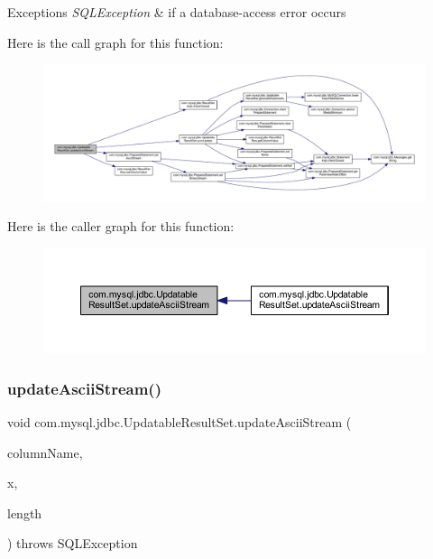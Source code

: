 \begin{DoxyExceptions}{Exceptions}
{\em S\+Q\+L\+Exception} & if a database-\/access error occurs \\
\hline
\end{DoxyExceptions}
Here is the call graph for this function\+:
\nopagebreak
\begin{figure}[H]
\begin{center}
\leavevmode
\includegraphics[width=350pt]{classcom_1_1mysql_1_1jdbc_1_1_updatable_result_set_ae9825fb720315b94d84b8b28d92d4921_cgraph}
\end{center}
\end{figure}
Here is the caller graph for this function\+:
\nopagebreak
\begin{figure}[H]
\begin{center}
\leavevmode
\includegraphics[width=350pt]{classcom_1_1mysql_1_1jdbc_1_1_updatable_result_set_ae9825fb720315b94d84b8b28d92d4921_icgraph}
\end{center}
\end{figure}
\mbox{\label{classcom_1_1mysql_1_1jdbc_1_1_updatable_result_set_ac539408d0c743944484724a8df4bf8c7}} 
\subsubsection{\texorpdfstring{update\+Ascii\+Stream()}{updateAsciiStream()}\hspace{0.1cm}{\footnotesize\ttfamily [2/2]}}
{\footnotesize\ttfamily void com.\+mysql.\+jdbc.\+Updatable\+Result\+Set.\+update\+Ascii\+Stream (\begin{DoxyParamCaption}\item[{String}]{column\+Name,  }\item[{java.\+io.\+Input\+Stream}]{x,  }\item[{int}]{length }\end{DoxyParamCaption}) throws S\+Q\+L\+Exception}


